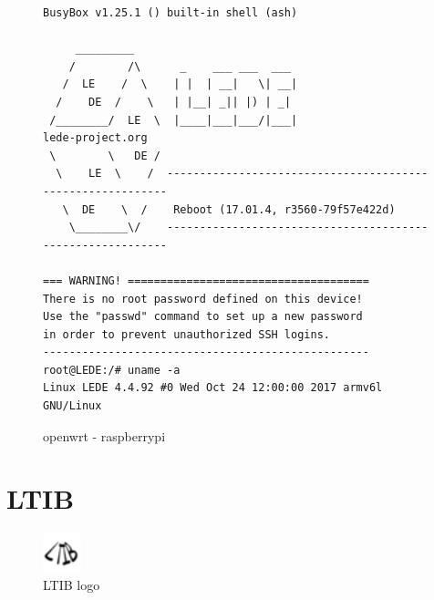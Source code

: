 \documentclass[printmode]{mgr}
\begin{document}
\begin{figure}
    \centering
\begin{verbatim}
BusyBox v1.25.1 () built-in shell (ash)

     _________
    /        /\      _    ___ ___  ___
   /  LE    /  \    | |  | __|   \| __|
  /    DE  /    \   | |__| _|| |) | _|
 /________/  LE  \  |____|___|___/|___|                      lede-project.org
 \        \   DE /
  \    LE  \    /  -----------------------------------------------------------
   \  DE    \  /    Reboot (17.01.4, r3560-79f57e422d)
    \________\/    -----------------------------------------------------------

=== WARNING! =====================================
There is no root password defined on this device!
Use the "passwd" command to set up a new password
in order to prevent unauthorized SSH logins.
--------------------------------------------------
root@LEDE:/# uname -a
Linux LEDE 4.4.92 #0 Wed Oct 24 12:00:00 2017 armv6l GNU/Linux
\end{verbatim}
    \caption{openwrt - raspberrypi}
\end{figure}









\section{LTIB}



\begin{figure}[htbp]
  \centering
    \includegraphics[width=0.1\textwidth]{ltib-logo.png}
    \caption{LTIB logo}
  \label{fig:ltib-logo}
\end{figure}
\end{document}
